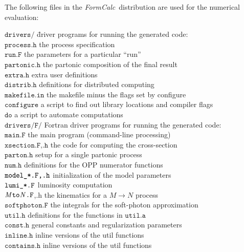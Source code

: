 \documentclass[twoside,11pt]{article}
\def\FC{\textit{FormCalc}}
\def\Var#1{\ensuremath{\mathit{#1}}}
\def\MtoN.#1{\Code{\Var{M}to\Var{N}.#1}}
\def\Code#1{\ensuremath{\texttt{#1}}}
\def\uscore{\symbol{95}}
\begin{document}
The following files in the \FC\ distribution are used for the numerical 
evaluation:
\begin{tabbing}
\Code{drivers/}\hspace{.18\linewidth} \=
	driver programs for running the generated code: \\
\quad\Code{process.h} \>
	the process specification \\
\quad\Code{run.F} \>
	the parameters for a particular ``run'' \\
\quad\Code{partonic.h} \>
	the partonic composition of the final result \\
\quad\Code{extra.h} \>
	extra user definitions \\
\quad\Code{distrib.h} \>
	definitions for distributed computing \\
\quad\Code{makefile.in} \>
	the makefile minus the flags set by configure \\
\quad\Code{configure} \>
	a script to find out library locations and compiler flags \\
\quad\Code{do} \>
	a script to automate computations
\\[1ex]
\Code{drivers/F/} \>
	Fortran driver programs for running the generated code: \\
\quad\Code{main.F} \>
	the main program (command-line processing) \\
\quad\Code{xsection.F,.h} \>
	the code for computing the cross-section \\
\quad\Code{parton.h} \>
	setup for a single partonic process \\
\quad\Code{num.h} \>
	definitions for the OPP numerator functions \\
\quad\Code{model\uscore *.F,.h} \>
	initialization of the model parameters \\
\quad\Code{lumi\uscore *.F} \>
	luminosity computation \\
\quad\MtoN.F,.h \>
	the kinematics for a $\Var{M}\to\Var{N}$ process \\
\quad\Code{softphoton.F} \>
	the integrals for the soft-photon approximation \\
\quad\Code{util.h} \>
	definitions for the functions in \Code{util.a} \\
\quad\Code{const.h} \>
	general constants and regularization parameters \\
\quad\Code{inline.h} \>
	inline versions of the util functions \\
\quad\Code{contains.h} \>
	inline versions of the util functions \\

\end{tabbing}
\end{document}

